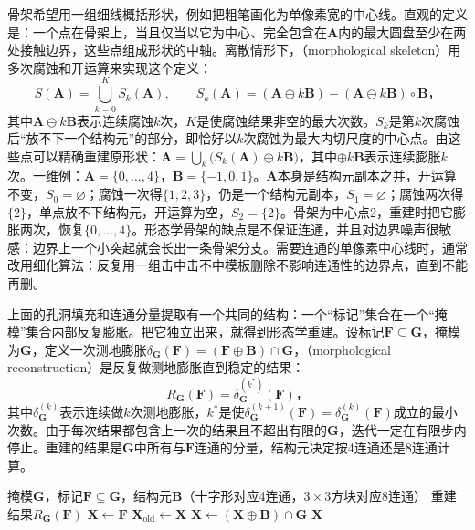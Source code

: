 骨架希望用一组细线概括形状，例如把粗笔画化为单像素宽的中心线。直观的定义是：一个点在骨架上，当且仅当以它为中心、完全包含在$\bm{A}$内的最大圆盘至少在两处接触边界，这些点组成形状的中轴。离散情形下，（morphological skeleton）用多次腐蚀和开运算来实现这个定义：
\begin{equation}
  S(\bm{A})=\bigcup_{k=0}^{K}S_k(\bm{A}),\qquad
  S_k(\bm{A})=(\bm{A}\ominus k\bm{B})-(\bm{A}\ominus k\bm{B})\circ\bm{B}\text{，}
  \label{eq:vision-transforms-skeleton}
\end{equation}
其中$\bm{A}\ominus k\bm{B}$表示连续腐蚀$k$次，$K$是使腐蚀结果非空的最大次数。$S_k$是第$k$次腐蚀后“放不下一个结构元”的部分，即恰好以$k$次腐蚀为最大内切尺度的中心点。由这些点可以精确重建原形状：$\bm{A}=\bigcup_k\bigl(S_k(\bm{A})\oplus k\bm{B}\bigr)$，其中$\oplus k\bm{B}$表示连续膨胀$k$次。一维例：$\bm{A}=\{0,\ldots,4\}$，$\bm{B}=\{-1,0,1\}$。$\bm{A}$本身是结构元副本之并，开运算不变，$S_0=\varnothing$；腐蚀一次得$\{1,2,3\}$，仍是一个结构元副本，$S_1=\varnothing$；腐蚀两次得$\{2\}$，单点放不下结构元，开运算为空，$S_2=\{2\}$。骨架为中心点2，重建时把它膨胀两次，恢复$\{0,\ldots,4\}$。形态学骨架的缺点是不保证连通，并且对边界噪声很敏感：边界上一个小突起就会长出一条骨架分支。需要连通的单像素中心线时，通常改用细化算法：反复用一组击中击不中模板删除不影响连通性的边界点，直到不能再删。

上面的孔洞填充和连通分量提取有一个共同的结构：一个“标记”集合在一个“掩模”集合内部反复膨胀。把它独立出来，就得到形态学重建。设标记$\bm{F}\subseteq\bm{G}$，掩模为$\bm{G}$，定义一次测地膨胀$\delta_{\bm{G}}(\bm{F})=(\bm{F}\oplus\bm{B})\cap\bm{G}$，（morphological reconstruction）是反复做测地膨胀直到稳定的结果：
\begin{equation}
  R_{\bm{G}}(\bm{F})=\delta_{\bm{G}}^{(k^{*})}(\bm{F})\text{，}
  \label{eq:vision-transforms-reconstruction}
\end{equation}
其中$\delta_{\bm{G}}^{(k)}$表示连续做$k$次测地膨胀，$k^{*}$是使$\delta_{\bm{G}}^{(k+1)}(\bm{F})=\delta_{\bm{G}}^{(k)}(\bm{F})$成立的最小次数。由于每次结果都包含上一次的结果且不超出有限的$\bm{G}$，迭代一定在有限步内停止。重建的结果是$\bm{G}$中所有与$\bm{F}$连通的分量，结构元决定按4连通还是8连通计算。

\begin{algorithm}[二值形态学重建]
  \label{alg:vision-transforms-reconstruction}
  \begin{algorithmic}[1]
    \Require 掩模$\bm{G}$，标记$\bm{F}\subseteq\bm{G}$，结构元$\bm{B}$（十字形对应4连通，$3\times3$方块对应8连通）
    \Ensure 重建结果$R_{\bm{G}}(\bm{F})$
    \State $\bm{X}\gets\bm{F}$
    \Repeat
      \State $\bm{X}_{\mathrm{old}}\gets\bm{X}$
      \State $\bm{X}\gets(\bm{X}\oplus\bm{B})\cap\bm{G}$
    \State \Return $\bm{X}$
  \end{algorithmic}
\end{algorithm}


